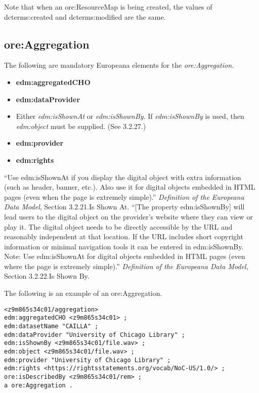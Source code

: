 \documentclass[11pt]{article}
\begin{document}
Note that when an ore:ResourceMap is being created, the values of dcterms:created and dcterms:modified are the same.

\subsection{ore:Aggregation}

The following are mandatory Europeana elements for the \textit{ore:Aggregation}.

\begin{itemize}
\item \textbf{edm:aggregatedCHO}
\item \textbf{edm:dataProvider}
\item Either \textit{edm:isShownAt} or \textit{edm:isShownBy}. If \textit{edm:isShownBy} is used, then \textit{edm:object} must be supplied. (See 3.2.27.)
\item \textbf{edm:provider}
\item \textbf{edm:rights}
\end{itemize}

``Use edm:isShownAt if you display the digital object with extra information (such as header, banner, etc.). Also use it for digital objects embedded in HTML pages (even when the page is extremely simple).'' \textit{Definition of the Europeana Data Model}, Section 3.2.21.Is Shown At. ``[The property edm:isShownBy] will lead users to the digital object on the provider's website where they can view or play it. The digital object needs to be directly accessible by the URL and reasonably independent at that location. If the URL includes short copyright information or minimal navigation tools it can be entered in edm:isShownBy. Note: Use edm:isShownAt for digital objects embedded in HTML pages (even where the page is extremely simple).'' \textit{Definition of the Europeana Data Model}, Section 3.2.22.Is Shown By.


The following is an example of an ore:Aggregation.

\begin{verbatim}
<z9m865s34c01/aggregation>
edm:aggregatedCHO <z9m865s34c01> ;
edm:datasetName "CAILLA" ;
edm:dataProvider "University of Chicago Library" ;
edm:isShownBy <z9m865s34c01/file.wav> ;
edm:object <z9m865s34c01/file.wav> ;
edm:provider "University of Chicago Library" ;
edm:rights <https://rightsstatements.org/vocab/NoC-US/1.0/> ;
ore:isDescribedBy <z9m865s34c01/rem> ;
a ore:Aggregation .
\end{verbatim}  
\end{document}
